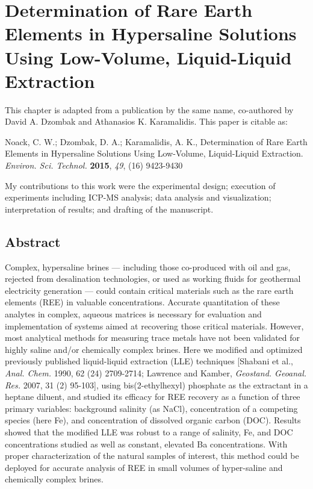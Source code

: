 \chapter{Determination of Rare Earth Elements in Hypersaline Solutions Using Low-Volume, Liquid-Liquid Extraction}\label{CH4}

This chapter is adapted from a publication by the same name, co-authored by David A. Dzombak and Athanasios K. Karamalidis.
This paper is citable as: 

Noack, C. W.; Dzombak, D. A.; Karamalidis, A. K., Determination of Rare Earth Elements in Hypersaline Solutions Using Low-Volume, Liquid-Liquid Extraction. \textit{Environ. Sci. Technol.} \textbf{2015}, \textit{49}, (16) 9423-9430

My contributions to this work were the experimental design; execution of experiments including ICP-MS analysis; data analysis and visualization; interpretation of results; and drafting of the manuscript.

\clearpage

\section*{Abstract}
Complex, hypersaline brines --- including those co-produced with oil and gas, rejected from desalination technologies, or used as working fluids for geothermal electricity generation --- could contain critical materials such as the rare earth elements (REE) in valuable concentrations.
Accurate quantitation of these analytes in complex, aqueous matrices is necessary for evaluation and implementation of systems aimed at recovering those critical materials.
However, most analytical methods for measuring trace metals have not been validated for highly saline and/or chemically complex brines.
Here we modified and optimized previously published liquid-liquid extraction (LLE) techniques [Shabani et al., \textit{Anal. Chem.} 1990, 62 (24) 2709-2714; Lawrence and Kamber, \textit{Geostand. Geoanal. Res.} 2007, 31 (2) 95-103], using bis(2-ethylhexyl) phosphate as the extractant in a heptane diluent, and studied its efficacy for REE recovery as a function of three primary variables: background salinity (as NaCl), concentration of a competing species (here Fe), and concentration of dissolved organic carbon (DOC).
Results showed that the modified LLE was robust to a range of salinity, Fe, and DOC concentrations studied as well as constant, elevated Ba concentrations.
With proper characterization of the natural samples of interest, this method could be deployed for accurate analysis of REE in small volumes of hyper-saline and chemically complex brines.

